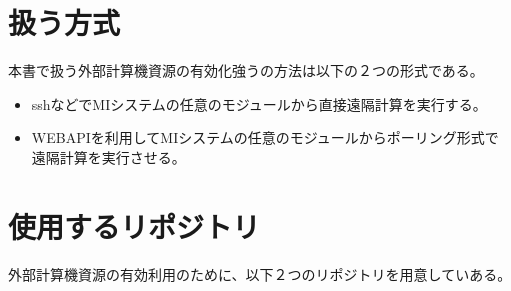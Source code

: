 \documentclass[letterpaper,10pt,dvipdfmx,openany]{sphinxmanual}
\begin{document}
\section{扱う方式}
\label{\detokenize{using_distributed_properties:id2}}
本書で扱う外部計算機資源の有効化強うの方法は以下の２つの形式である。
\begin{itemize}
\item {} 
sshなどでMIシステムの任意のモジュールから直接遠隔計算を実行する。

\item {} 
WEBAPIを利用してMIシステムの任意のモジュールからポーリング形式で遠隔計算を実行させる。

\end{itemize}


\section{使用するリポジトリ}
\label{\detokenize{using_distributed_properties:id3}}
外部計算機資源の有効利用のために、以下２つのリポジトリを用意していある。
\end{document}
